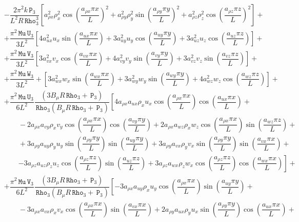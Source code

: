 \documentclass[10pt]{article}
\newcommand{\Rho}{\,\mathtt{Rho}}
\newcommand{\PP}{\,\mathtt{P}}
\newcommand{\U}{\,\mathtt{U}}
\newcommand{\V}{\,\mathtt{V}}
\newcommand{\W}{\,\mathtt{W}}
\newcommand{\MU}{\,\mathtt{Mu}}
\begin{document}
\begin{equation*}
\begin{split}
&-  \dfrac{2\pi^2 k \PP_3}{L^2 R \Rho_3^3}\left[a_{\rho x}^2 \rho_x^2 \cos\left(\dfrac{a_{\rho x} \pi x}{L}\right)^2+a_{\rho y}^2 \rho_y^2 \sin\left(\dfrac{a_{\rho y} \pi y}{L}\right)^2+a_{\rho z}^2 \rho_z^2 \cos\left(\dfrac{a_{\rho z} \pi z}{L}\right)^2\right] +\\
&+\dfrac{  \pi^2 \MU \U_3 }{3L^2}\left[4 a_{ux}^2 u_x \sin\left(\dfrac{a_{ux} \pi x}{L}\right)+3 a_{uy}^2 u_y \cos\left(\dfrac{a_{uy} \pi y}{L}\right)+3 a_{uz}^2 u_z \cos\left(\dfrac{a_{uz} \pi z}{L}\right)\right] +\\
%
&+ \dfrac{  \pi^2 \MU \V_3 }{3L^2}\left[3 a_{vx}^2 v_x \cos\left(\dfrac{a_{vx} \pi x}{L}\right)+4 a_{vy}^2 v_y \sin\left(\dfrac{a_{vy} \pi y}{L}\right)+3 a_{vz}^2 v_z \sin\left(\dfrac{a_{vz} \pi z}{L}\right)\right] +\\
%
&+ \dfrac{  \pi^2 \MU \W_3  }{3L^2} +\left[3 a_{wx}^2 w_x \sin\left(\dfrac{a_{wx} \pi x}{L}\right)+3 a_{wy}^2 w_y \sin\left(\dfrac{a_{wy} \pi y}{L}\right)+4 a_{wz}^2 w_z \cos\left(\dfrac{a_{wz} \pi z}{L}\right)\right]+\\
%
&+ \dfrac{ \pi^2 \MU \U_3 }{6L^2} \dfrac{(3 B_\mu R \Rho_3+\PP_3)}{\Rho_3 (B_\mu R \Rho_3+\PP_3) } \left[4 a_{\rho x} a_{ux} \rho_x u_x \cos\left(\dfrac{a_{\rho x} \pi x}{L}\right) \cos\left(\dfrac{a_{ux} \pi x}{L}\right)+\right.\\
    &\qquad -2 a_{\rho x} a_{vy} \rho_x v_y \cos\left(\dfrac{a_{\rho x} \pi x}{L}\right) \cos\left(\dfrac{a_{vy} \pi y}{L}\right)+2 a_{\rho x} a_{wz} \rho_x w_z \cos\left(\dfrac{a_{\rho x} \pi x}{L}\right) \sin\left(\dfrac{a_{wz} \pi z}{L}\right)+\\
    &\qquad+3 a_{\rho y} a_{uy} \rho_y u_y \sin\left(\dfrac{a_{\rho y} \pi y}{L}\right) \sin\left(\dfrac{a_{uy} \pi y}{L}\right)+3 a_{\rho y} a_{vx} \rho_y v_x \sin\left(\dfrac{a_{\rho y} \pi y}{L}\right) \sin\left(\dfrac{a_{vx} \pi x}{L}\right)+\\
    &\qquad\left. -3 a_{\rho z} a_{uz} \rho_z u_z \cos\left(\dfrac{a_{\rho z} \pi z}{L}\right) \sin\left(\dfrac{a_{uz} \pi z}{L}\right)+3 a_{\rho z} a_{wx} \rho_z w_x \cos\left(\dfrac{a_{\rho z} \pi z}{L}\right) \cos\left(\dfrac{a_{wx} \pi x}{L}\right)\right] +\\
%
&+\dfrac{ \pi^2 \MU \V_3 }{6L^2} \dfrac{(3 B_\mu R \Rho_3+\PP_3)}{\Rho_3 (B_\mu R \Rho_3+\PP_3) }   \left[-3 a_{\rho x} a_{uy} \rho_x u_y \cos\left(\dfrac{a_{\rho x} \pi x}{L}\right) \sin\left(\dfrac{a_{uy} \pi y}{L}\right)+\right.\\
    &\qquad-3 a_{\rho x} a_{vx} \rho_x v_x \cos\left(\dfrac{a_{\rho x} \pi x}{L}\right) \sin\left(\dfrac{a_{vx} \pi x}{L}\right)+2 a_{\rho y} a_{ux} \rho_y u_x \sin\left(\dfrac{a_{\rho y} \pi y}{L}\right) \cos\left(\dfrac{a_{ux} \pi x}{L}\right)+\\

\end{split}
\end{equation*}
\end{document}
